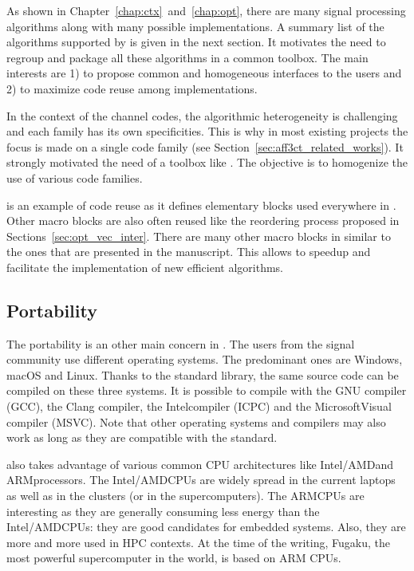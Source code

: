 As shown in Chapter~\ref{chap:ctx}~and~\ref{chap:opt}, there are many signal
processing algorithms along with many possible implementations. A summary list
of the algorithms supported by \AFFECT is given in the next section. It
motivates the need to regroup and package all these algorithms in a common
toolbox. The main interests are 1) to propose common and homogeneous interfaces
to the users and 2) to maximize code reuse among implementations.

In the context of the channel codes, the algorithmic heterogeneity is
challenging and each family has its own specificities. This is why in most
existing projects the focus is made on a single code family (see
Section~\ref{sec:aff3ct_related_works}). It strongly motivated the need of a
toolbox like \AFFECT. The objective is to homogenize the use of various code
families.

\MIPP is an example of code reuse as it defines elementary blocks used
everywhere in \AFFECT. Other macro blocks are also often reused like the
reordering process proposed in Sections~\ref{sec:opt_vec_inter}. There are many
other macro blocks in \AFFECT similar to the ones that are presented in the
manuscript. This allows to speedup and facilitate the implementation of new
efficient algorithms.

\subsection{Portability}

The portability is an other main concern in \AFFECT. The users from the signal
community use different operating systems. The predominant ones are Windows,
macOS and Linux. Thanks to the  standard library, the same \AFFECT
source code can be compiled on these three systems. It is possible to compile
with the GNU compiler (GCC), the Clang compiler, the Intel\R \Cxx compiler
(ICPC) and the Microsoft\R Visual compiler (MSVC). Note that other operating
systems and compilers may also work as long as they are compatible with the
 standard.

\AFFECT also takes advantage of various common CPU architectures like
Intel\R/AMD\R and ARM\R processors. The Intel\R/AMD\R CPUs are widely spread
in the current laptops as well as in the clusters (or in the supercomputers).
The ARM\R CPUs are interesting as they are generally consuming less energy than
the Intel\R/AMD\R CPUs: they are good candidates for embedded systems. Also,
they are more and more used in HPC contexts. At the time of the writing, Fugaku,
the most powerful supercomputer in the world, is based on ARM CPUs.


